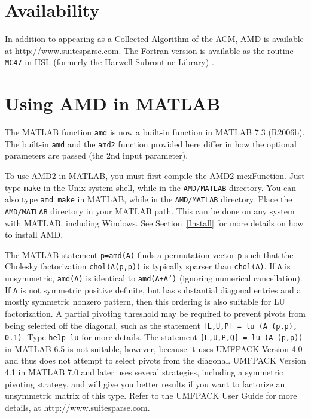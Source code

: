 \documentclass[11pt]{article}
\begin{document}
\section{Availability}

In addition to appearing as a Collected Algorithm of the ACM, \newline
AMD is available at http://www.suitesparse.com.
The Fortran version is available as the routine {\tt MC47} in HSL
(formerly the Harwell Subroutine Library) \cite{hsl:2002}.

\section{Using AMD in MATLAB}

The MATLAB function {\tt amd} is now a built-in function in MATLAB 7.3
(R2006b).  The built-in {\tt amd} and the {\tt amd2} function provided here
differ in how the optional parameters are passed
(the 2nd input parameter).

To use AMD2 in MATLAB, you must first compile the AMD2 mexFunction.
Just type {\tt make} in the Unix system shell, while in the {\tt AMD/MATLAB}
directory.  You can also type {\tt amd\_make} in MATLAB, while in the
{\tt AMD/MATLAB} directory.  Place the {\tt AMD/MATLAB} directory in your
MATLAB path.  This can be done on any system with MATLAB, including Windows.
See Section~\ref{Install} for more details on how to install AMD.

The MATLAB statement {\tt p=amd(A)} finds a permutation vector {\tt p} such
that the Cholesky factorization {\tt chol(A(p,p))} is typically sparser than
{\tt chol(A)}.
If {\tt A} is unsymmetric, {\tt amd(A)} is identical to {\tt amd(A+A')}
(ignoring numerical cancellation).
If {\tt A} is not symmetric positive definite,
but has substantial diagonal entries and a mostly symmetric nonzero pattern,
then this ordering is also suitable for LU factorization.  A partial pivoting
threshold may be required to prevent pivots from being selected off the
diagonal, such as the statement {\tt [L,U,P] = lu (A (p,p), 0.1)}.
Type {\tt help lu} for more details.
The statement {\tt [L,U,P,Q] = lu (A (p,p))} in MATLAB 6.5 is
not suitable, however, because it uses UMFPACK Version 4.0 and thus
does not attempt to select pivots from the diagonal.
UMFPACK Version 4.1 in MATLAB 7.0 and later
uses several strategies, including a symmetric pivoting strategy, and
will give you better results if you want to factorize an unsymmetric matrix
of this type.  Refer to the UMFPACK User Guide for more details, at
http://www.suitesparse.com.
\end{document}

